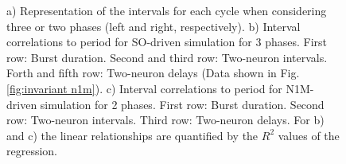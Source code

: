 \begin{figure}[hbt!]
\begin{minipage}[b]{0.45\textwidth}
\begin{minipage}[b]{\textwidth}
		\end{minipage}
	
		\vspace{50pt}
	\end{minipage}
	\caption{a) Representation of the intervals for each cycle when considering three or two phases (left and right, respectively). b) Interval correlations to period for SO-driven simulation for 3 phases. First row: Burst duration. Second and third row: Two-neuron intervals. Forth and fifth row: Two-neuron delays (Data shown in Fig. \ref{fig:invariant n1m}). c) Interval correlations to period for N1M-driven simulation for 2 phases. First row: Burst duration. Second row: Two-neuron intervals. Third row: Two-neuron delays. For b) and c) the linear relationships are quantified by the $R^2$ values of the regression.}
	\label{fig:invariant n1m model 2 phases}
\end{figure}


\clearpage
\newpage
